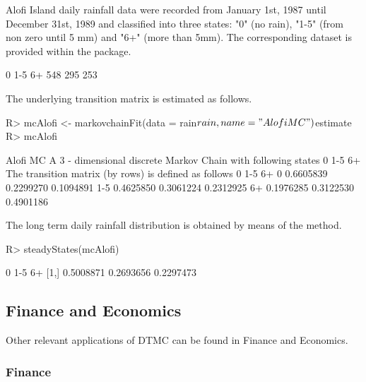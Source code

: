 \documentclass[nojss]{jss}
\begin{document}
Alofi Island daily rainfall
data were recorded from January 1st, 1987 until December 31st, 1989 and
classified into three states: "0" (no rain), "1-5" (from non zero until 5 mm) and "6+" (more than 5mm). The corresponding dataset is provided within the
 package.

\begin{Schunk}
\begin{Soutput}
  0 1-5  6+ 
548 295 253 
\end{Soutput}
\end{Schunk}

The underlying transition matrix is estimated as follows.

\begin{Schunk}
\begin{Sinput}
R> mcAlofi <- markovchainFit(data = rain$rain, name = "Alofi MC")$estimate
R> mcAlofi
\end{Sinput}
\begin{Soutput}
Alofi MC 
 A  3 - dimensional discrete Markov Chain with following states 
 0 1-5 6+ 
 The transition matrix   (by rows)  is defined as follows 
            0       1-5        6+
0   0.6605839 0.2299270 0.1094891
1-5 0.4625850 0.3061224 0.2312925
6+  0.1976285 0.3122530 0.4901186
\end{Soutput}
\end{Schunk}

The long term daily rainfall distribution is obtained by means of the  method.

\begin{Schunk}
\begin{Sinput}
R> steadyStates(mcAlofi)
\end{Sinput}
\begin{Soutput}
             0       1-5        6+
[1,] 0.5008871 0.2693656 0.2297473
\end{Soutput}
\end{Schunk}


\subsection{Finance and Economics}\label{app:fin}

Other relevant applications of DTMC can be found in Finance and Economics.

\subsubsection{Finance}\label{fin:fin}
\end{document}
